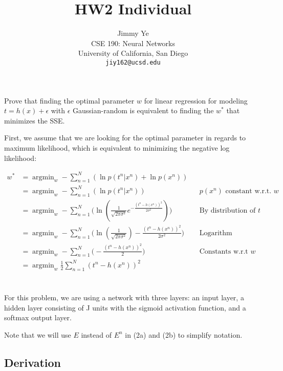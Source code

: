 \documentclass{article} %
\title{HW2 Individual}
\author{
  Jimmy Ye\\
  CSE 190: Neural Networks\\
  University of California, San Diego\\
  \texttt{jiy162@ucsd.edu} \\
}
\newcommand{\argmin}{\operatorname{argmin}}
\begin{document}
\maketitle

\section{}

Prove that finding the optimal parameter $w$ for linear regression for modeling
$t = h(x) + \epsilon$ with $\epsilon$ Gaussian-random is equivalent to finding
the $w^*$ that minimizes the SSE.

First, we assume that we are looking for the optimal parameter in regards to
maximum likelihood, which is equivalent to minimizing the negative log
likelihood:

\begin{align}
  w^*
  &= \argmin_w - \sum_{n=1}^N (\ln p(t^n | x^n) + \ln p(x^n))\\
  &= \argmin_w - \sum_{n=1}^N (\ln p(t^n | x^n))
  && p(x^n) \text{ constant w.r.t. } w\\
  &= \argmin_w - \sum_{n=1}^N \Big(\ln (\frac{1}{\sqrt{2 \pi \sigma^2}} e^{-\frac{(t^n - h(x^n))^2}{2 \sigma^2}})\Big)
  && \text{By distribution of } t\\
  &= \argmin_w - \sum_{n=1}^N \Big(\ln (\frac{1}{\sqrt{2 \pi \sigma^2}}) - \frac{(t^n - h(x^n))^2}{2 \sigma^2}\Big)
  && \text{Logarithm properties}\\
  &= \argmin_w - \sum_{n=1}^N \Big(- \frac{(t^n - h(x^n))^2}{2}\Big)
  && \text{Constants w.r.t } w\\
  &= \argmin_w \frac{1}{2} \sum_{n=1}^N (t^n - h(x^n))^2
\end{align}

\newpage

\section{}

For this problem, we are using a network with three layers: an input layer, a
hidden layer consisting of J units with the sigmoid activation function, and a
softmax output layer.

Note that we will use $E$ instead of $E^n$ in (2a) and (2b) to simplify notation.

\subsection{Derivation}
\end{document}
